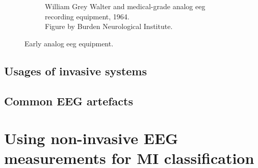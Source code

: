 \begin{figure}[ht]
\begin{minipage}{\textwidth}
\begin{subfigure}{.48\textwidth}
        \captionsetup{width=0.9\linewidth}
        \captionsetup{justification=centering}
        \caption{William Grey Walter and medical-grade analog \gls{eeg} recording equipment, 1964.\\Figure by Burden Neurological Institute\footnotemark[3].}
        \label{fig:eeg_hardware_evolution_4}
    \end{subfigure}
    \captionsetup{width=0.9\linewidth}
    \captionsetup{justification=centering}
    \caption{Early analog \gls{eeg} equipment.}
    \label{fig:eeg_hardware_early_analog}
  \end{minipage}  
\end{figure}


\subsection{Usages of invasive systems}
\label{subsec:biomedical_signals_measuring_invasive}

\lipsum[1-3]


\subsection{Common EEG artefacts}
\label{subsec:biomedical_signals_measuring_artefacts}

\lipsum[1-4]



\section{Using non-invasive EEG measurements for MI classification}
\label{sec:biomedical_signals_eeg_for_mi_classification}

\lipsum[1-2]